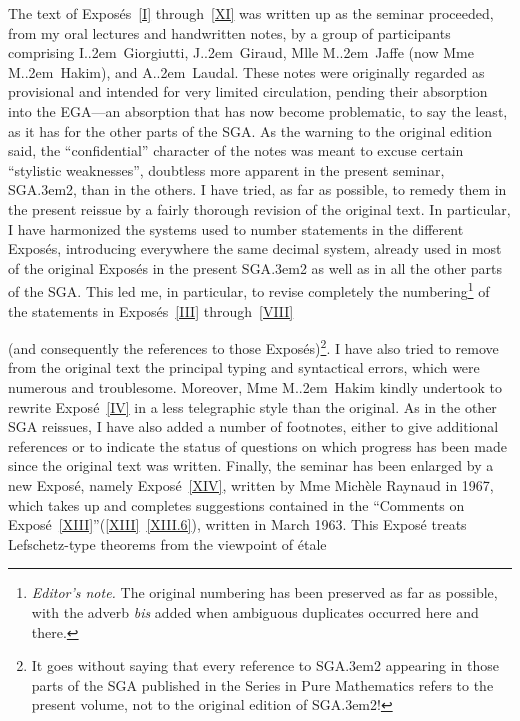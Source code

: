 \documentclass[11pt,a4paper,oneside]{book}
\providecommand{\sisi}[2]{#2}
\providecommand{\pageoriginale}{%
  \refstepcounter{pageoriginal}%
  \marginpar{\raggedright\footnotesize\bfseries\thepageoriginal}%
  \xspace}
\providecommand{\nde}[1]{\footnote{\textit{Editor's note.} #1}}
\providecommand{\sfootnote}[1]{\footnote{#1}}
\providecommand{\og}{``}
\providecommand{\fg}{''\xspace}
\providecommand{\SGA}{\textup{SGA}\kern.3em}
\providecommand{\ptbl}{.\kern.2em}
\theoremstyle{plain}
\theoremstyle{definition}
\theoremstyle{remark}
\renewcommand{\Ref}[1]{\textup{\ref{#1}}}
\begin{document}
The text of Expos\'es~\Ref{I} through~\Ref{XI} was written up as the
seminar proceeded, from my oral lectures and handwritten notes, by a group
of participants comprising I\ptbl~\sisi{GIROGUITTI}{Giorgiutti},
J\ptbl~\sisi{GIRAUD}{Giraud}, Mlle M\ptbl~\sisi{JAFFE}{Jaffe} (now
Mme M\ptbl~\sisi{HAKIM}{Hakim}), and A\ptbl~\sisi{LAUDAL}{Laudal}.
These notes were originally regarded as provisional and intended for very
limited circulation, pending their absorption into the EGA---an absorption
that has now become problematic, to say the least, as it has for the other
parts of the SGA. As the warning to the original edition said, the
\og confidential\fg character of the notes was meant to excuse certain
\og stylistic weaknesses\fg, doubtless more apparent in the present
seminar, \SGA 2, than in the others. I have tried, as far as possible, to
remedy them in the present reissue by a fairly thorough revision of the
original text. In particular, I have harmonized the systems used to number
statements in the different Expos\'es, introducing everywhere the same
decimal system, already used in most of the original Expos\'es in the
present \SGA 2 as well as in all the other parts of the SGA. This led me,
in particular, to revise completely the numbering\nde{The original
numbering has been preserved as far as possible, with the adverb
\emph{bis} added when ambiguous duplicates occurred here and there.} of
the statements in Expos\'es~\Ref{III} through~\Ref{VIII}\pageoriginale
(and consequently the references to those Expos\'es)\sfootnote{It goes
without saying that every reference to \SGA 2 appearing in those parts of
the SGA published in the \sisi{SERIES IN PURE MATHEMATICS}{Series in Pure
Mathematics} refers to the present volume, not to the original edition of
\SGA 2!}. I have also tried to remove from the original text the principal
typing and syntactical errors, which were numerous and troublesome.
Moreover, Mme M\ptbl~\sisi{HAKIM}{Hakim} kindly undertook to rewrite
Expos\'e~\Ref{IV} in a less telegraphic style than the original. As in the
other SGA reissues, I have also added a number of footnotes, either to give
additional references or to indicate the status of questions on which
progress has been made since the original text was written. Finally, the
seminar has been enlarged by a new Expos\'e, \sisi{namely}{namely}
Expos\'e~\Ref{XIV}, written by Mme\sisi{.}{}
\sisi{MICH\`ELE RAYNAUD}{Mich\`ele Raynaud} in 1967, which takes up and
completes suggestions contained in the \og Comments on
Expos\'e~\Ref{XIII}\fg (\Ref{XIII}~\Ref{XIII.6}), written in March 1963.
This Expos\'e treats Lefschetz-type theorems from the viewpoint of \'etale
\end{document}
